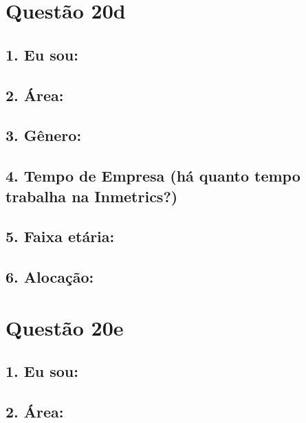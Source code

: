 \documentclass[]{book}
\begin{document}
\hypertarget{questao-20d}{%
\section{Questão 20d}\label{questao-20d}}

\hypertarget{eu-sou-56}{%
\subsection{1. Eu sou:}\label{eu-sou-56}}

\hypertarget{area-56}{%
\subsection{2. Área:}\label{area-56}}

\hypertarget{genero-56}{%
\subsection{3. Gênero:}\label{genero-56}}

\hypertarget{tempo-de-empresa-ha-quanto-tempo-trabalha-na-inmetrics-56}{%
\subsection{4. Tempo de Empresa (há quanto tempo trabalha na Inmetrics?)}\label{tempo-de-empresa-ha-quanto-tempo-trabalha-na-inmetrics-56}}

\hypertarget{faixa-etaria-56}{%
\subsection{5. Faixa etária:}\label{faixa-etaria-56}}

\hypertarget{alocacao-56}{%
\subsection{6. Alocação:}\label{alocacao-56}}

\hypertarget{questao-20e}{%
\section{Questão 20e}\label{questao-20e}}

\hypertarget{eu-sou-57}{%
\subsection{1. Eu sou:}\label{eu-sou-57}}

\hypertarget{area-57}{%
\subsection{2. Área:}\label{area-57}}
\end{document}

